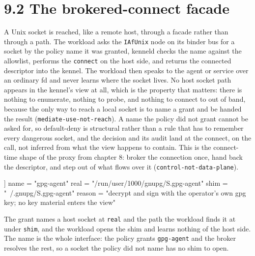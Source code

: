 \hypertarget{the-brokered-connect-facade}{%
\section{9.2 The brokered-connect
facade}\label{the-brokered-connect-facade}}

A Unix socket is reached, like a remote host, through a facade rather
than through a path. The workload asks the \texttt{IAfUnix} node on its
binder bus for a socket by the policy name it was granted, kenneld
checks the name against the allowlist, performs the \texttt{connect} on
the host side, and returns the connected descriptor into the kennel. The
workload then speaks to the agent or service over an ordinary fd and
never learns where the socket lives. No host socket path appears in the
kennel's view at all, which is the property that matters: there is
nothing to enumerate, nothing to probe, and nothing to connect to out of
band, because the only way to reach a local socket is to name a grant
and be handed the result (\texttt{mediate-use-not-reach}). A name the
policy did not grant cannot be asked for, so default-deny is structural
rather than a rule that has to remember every dangerous socket, and the
decision and its audit land at the connect, on the call, not inferred
from what the view happens to contain. This is the connect-time shape of
the proxy from chapter 8: broker the connection once, hand back the
descriptor, and step out of what flows over it
(\texttt{control-not-data-plane}).

\begin{kennelcode}
[[unix.allow]]
name = "gpg-agent"
real = "/run/user/1000/gnupg/S.gpg-agent"
shim = "~/.gnupg/S.gpg-agent"
reason = "decrypt and sign with the operator's own gpg key; no key material enters the view"
\end{kennelcode}

The grant names a host socket at \texttt{real} and the path the workload
finds it at under \texttt{shim}, and the workload opens the shim and
learns nothing of the host side. The name is the whole interface: the
policy grants \texttt{gpg-agent} and the broker resolves the rest, so a
socket the policy did not name has no shim to open.

